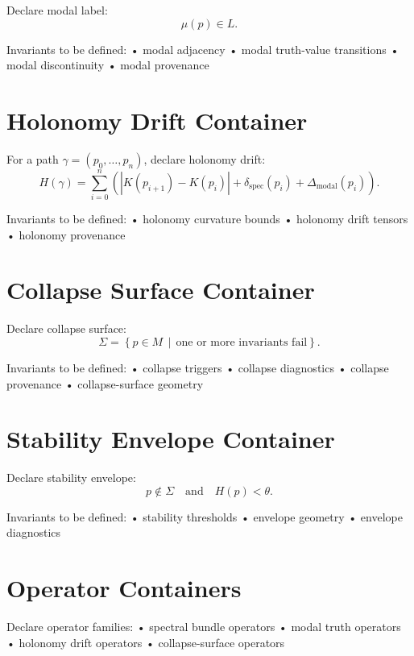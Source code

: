 \documentclass[11pt]{article}
\begin{document}
Declare modal label:
\[
\mu(p) \in L.
\]

Invariants to be defined:
  • modal adjacency  
  • modal truth-value transitions  
  • modal discontinuity  
  • modal provenance  

\section{Holonomy Drift Container}

For a path $\gamma = (p_0, \ldots, p_n)$, declare holonomy drift:
\[
H(\gamma)
  = \sum_{i=0}^{n}
      \left(
        |K(p_{i+1}) - K(p_i)|
        + \delta_{\mathrm{spec}}(p_i)
        + \Delta_{\mathrm{modal}}(p_i)
      \right).
\]

Invariants to be defined:
  • holonomy curvature bounds  
  • holonomy drift tensors  
  • holonomy provenance  

\section{Collapse Surface Container}

Declare collapse surface:
\[
\Sigma
  = \left\{
      p \in M \,\middle|\,
      \text{one or more invariants fail}
    \right\}.
\]

Invariants to be defined:
  • collapse triggers  
  • collapse diagnostics  
  • collapse provenance  
  • collapse-surface geometry  

\section{Stability Envelope Container}

Declare stability envelope:
\[
p \notin \Sigma
\quad\text{and}\quad
H(p) < \theta.
\]

Invariants to be defined:
  • stability thresholds  
  • envelope geometry  
  • envelope diagnostics  

\section{Operator Containers}

Declare operator families:
  • spectral bundle operators  
  • modal truth operators  
  • holonomy drift operators  
  • collapse-surface operators  
\end{document}
